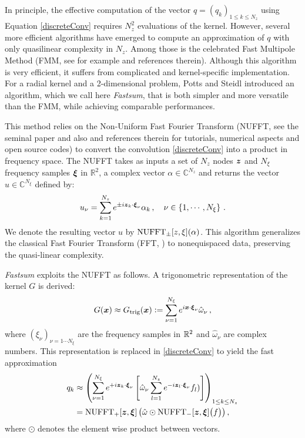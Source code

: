 \documentclass[main]{subfiles}
\begin{document}
In principle, the effective computation of the vector $q = (q_k)_{1 \leq k\leq N_z}$ using Equation \eqref{discreteConv} requires $N_z^2$ evaluations of the kernel. However, several more efficient algorithms have emerged to compute an approximation of $q$ with only quasilinear complexity in $N_z$. Among those is the celebrated Fast Multipole Method (FMM, see for example \cite{greengard1988rapid,rokhlin1990rapid, rokhlin1993diagonal, coifman1993fast, cheng1999fast} and references therein). Although this algorithm is very efficient, it suffers from complicated and kernel-specific implementation. For a radial kernel and a 2-dimensional problem, Potts and Steidl \cite{potts2004fast} introduced an algorithm, which we call here \textit{Fastsum}, that is both simpler and more versatile than the FMM, while achieving comparable performances. 

This method relies on the Non-Uniform Fast Fourier Transform (NUFFT, see the seminal paper \cite{NuFFT} and also \cite{greengard2004accelerating,poplau2006calculation,keiner2009using,potts2001fast} and references therein for tutorials, numerical aspects and open source codes) to convert the convolution \eqref{discreteConv} into a product in frequency space. The NUFFT takes as inputs a set of $N_z$ nodes $\boldsymbol{z}$ and $N_\xi$ frequency samples $\boldsymbol{\xi}$ in $\mathbb{R}^2$, a complex vector $\alpha  \in \mathbb{C}^{N_z}$ and returns the vector  $u \in \mathbb{C}^{N_\xi}$ defined by:
\vspace{-0.1cm}
\[ u_\nu = \sum_{k = 1}^{N_z} e^{\pm i \boldsymbol{z}_k \cdot \boldsymbol{\xi}_\nu} \alpha_k\,, \quad \nu \in \left\{1,\cdots,N_\xi \right\}\,.\]
We denote the resulting vector $u$ by $\textup{NUFFT}_{\pm}[z,\xi](\alpha)$. 
This algorithm generalizes the classical Fast Fourier Transform (FFT,  \cite{cooley1965algorithm}) to nonequispaced data, preserving the quasi-linear complexity.

\textit{Fastsum} exploits the NUFFT as follows. A trigonometric representation of the kernel $G$ is derived:
\begin{equation}
\label{Gapprox}
G(\boldsymbol{x}) \approx G_{\text{trig}}(\boldsymbol{x}) \mathrel{\mathop:}= \sum_{\nu=1}^{N_\xi} e^{i  \boldsymbol{x}\cdot \boldsymbol{\xi}_\nu} \hat{\omega}_\nu\,,
\end{equation}
where $(\xi_\nu)_{\nu = 1 \cdots N_\xi}$ are the frequency samples in $\mathbb{R}^2$ and $\hat{\omega}_\nu$ are complex numbers. This representation is replaced in \eqref{discreteConv} to yield the fast approximation
\begin{equation}
\begin{split}	q_{k} &\approx \left(\sum_{\nu = 1}^{N_\xi} e^{+i  \boldsymbol{z}_k  \cdot\boldsymbol{\xi}_\nu } \left[\hat{\omega}_\nu \sum_{l=1}^{N_z} e^{- i \boldsymbol{z}_l \cdot \boldsymbol{\xi}_\nu} f_l) \right]\right)_{1 \leq k \leq N_z}\\
&= \operatorname{NUFFT}_+[\boldsymbol{z},\boldsymbol{\xi}]\left(\hat{\omega} \odot \operatorname{NUFFT}_-[\boldsymbol{z},\boldsymbol{\xi}]\big(f\big)\right),
\end{split}
\label{far convolution}					
\end{equation}
where $\odot$ denotes the element wise product between vectors.
\end{document}
